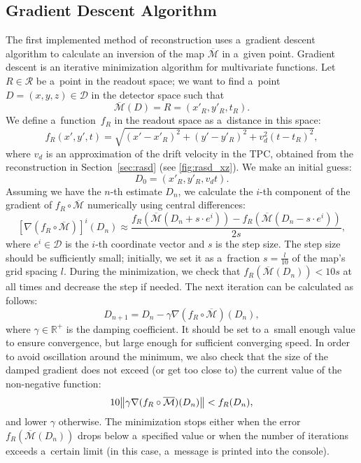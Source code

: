 		\subsection{Gradient Descent Algorithm}
		\label{sec:grad}			
			The first implemented method of reconstruction uses a~gradient descent algorithm to calculate an inversion of the map $\overline{\mathcal{M}}$ in a~given point. Gradient descent is an iterative minimization algorithm for multivariate functions. Let $R\in\mathcal{R}$ be a~point in the readout space; we want to find a~point $D = (x,y,z) \in\mathcal{D}$ in the detector space such that 
				\begin{equation}
					\overline{\mathcal{M}}(D) = R = (x'_R,y'_R,t_R).
				\end{equation}
			We define a~function~$f_R$ in the readout space as a~distance in this space:
				\begin{equation}
					f_R(x',y',t) = \sqrt{(x'-x'_R)^2+(y'-y'_R)^2+v_d^2(t-t_R)^2},
				\end{equation}
			where $v_d$ is an approximation of the drift velocity in the \ac{TPC}, obtained from the reconstruction in Section~\ref{sec:rasd} (see \cref{fig:rasd_xz}). We make an initial guess:
				\begin{equation}
					D_0 = (x'_R,y'_R,v_dt).
				\end{equation}
			Assuming we have the $n$-th estimate $D_n$, we calculate the $i$-th component of the gradient of $f_R\circ\overline{\mathcal{M}}$ numerically using central differences:
				\begin{equation}
					\left[\nabla(f_R\circ\overline{\mathcal{M}})\right]^i(D_n) \approx \frac{f_R(\overline{\mathcal{M}}(D_n+s\cdot e^i))-f_R(\overline{\mathcal{M}}(D_n-s\cdot e^i))}{2s},
				\end{equation}
			where $e^i\in\mathcal{D}$ is the $i$-th coordinate vector and $s$ is the step size. The step size should be sufficiently small; initially, we set it as a~fraction $s = \frac{l}{10}$ of the map's grid spacing $l$. During the minimization, we check that $f_R(\overline{\mathcal{M}}(D_n))<10s$ at all times and decrease the step if needed. The next iteration can be calculated as follows:
				\begin{equation}
					D_{n+1} = D_n - \gamma \nabla(f_R\circ\overline{\mathcal{M}})(D_n),
				\end{equation}
			where $\gamma\in\mathbb{R}^+$ is the damping coefficient. It should be set to a~small enough value to ensure convergence, but large enough for sufficient converging speed. In order to avoid oscillation around the minimum, we also check that the size of the damped gradient does not exceed (or get too close to) the current value of the non-negative function:
				\begin{equation}
					10 \norm{\gamma \nabla(f_R\circ\overline{\mathcal{M}})(D_n)} < f_R(D_n),
				\end{equation}
			and lower $\gamma$ otherwise. The minimization stops either when the error $f_R(\overline{\mathcal{M}}(D_n))$ drops below a~specified value or when the number of iterations exceeds a~certain limit (in this case, a~message is printed into the console).
			
